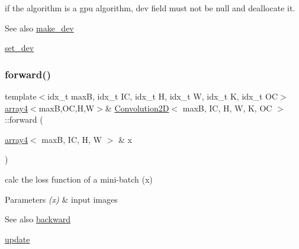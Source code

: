 if the algorithm is a gpu algorithm, dev field must not be null and deallocate it. 

\begin{DoxySeeAlso}{See also}
\hyperlink{structConvolution2D_a9c6908bf3797c1b38dec8c33beb8df49}{make\+\_\+dev} 

\hyperlink{structConvolution2D_a4e0dca3719249dbceb4afe64f8844f7f}{set\+\_\+dev} 
\end{DoxySeeAlso}
\mbox{\label{structConvolution2D_ae6dcfaea38b779de24bbda730c57083e}} 
\subsubsection{\texorpdfstring{forward()}{forward()}}
{\footnotesize\ttfamily template$<$idx\+\_\+t maxB, idx\+\_\+t IC, idx\+\_\+t H, idx\+\_\+t W, idx\+\_\+t K, idx\+\_\+t OC$>$ \\
\hyperlink{structarray4}{array4}$<$maxB,OC,H,W$>$\& \hyperlink{structConvolution2D}{Convolution2D}$<$ maxB, IC, H, W, K, OC $>$\+::forward (\begin{DoxyParamCaption}\item[{\hyperlink{structarray4}{array4}$<$ maxB, IC, H, W $>$ \&}]{x }\end{DoxyParamCaption})\hspace{0.3cm}{\ttfamily [inline]}}



calc the loss function of a mini-\/batch (x) 


\begin{DoxyParams}{Parameters}
{\em (x)} & input images \\
\hline
\end{DoxyParams}
\begin{DoxySeeAlso}{See also}
\hyperlink{structConvolution2D_ace928f0589a42b6505f5787652ffbacd}{backward} 

\hyperlink{structConvolution2D_ac9fd666f96904bb7f62dc39cebae7a25}{update} 
\end{DoxySeeAlso}
\mbox{\label{structConvolution2D_aa969d35c6c2ca209354d3fd9249fcf82}} 
